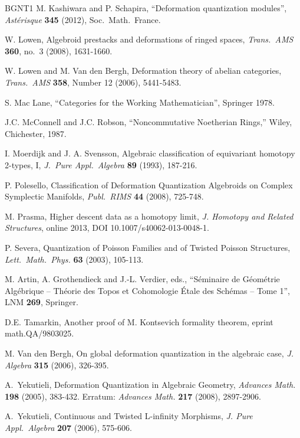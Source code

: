 \documentclass[a4paper, 10pt]{amsart}
\theoremstyle{definition}
\numberwithin{equation}{section}
\begin{document}
\begin{thebibliography}{BGNT1}
 M. Kashiwara and P. Schapira,
   ``Deformation quantization modules'',
    {\em Ast\'erisque} {\bf 345}  (2012), Soc.\ Math.\ France.

 W. Lowen,
    Algebroid prestacks and deformations of ringed spaces,
    {\em Trans.\ AMS} {\bf 360}, no.\ 3 (2008), 1631-1660.

 W. Lowen and M. Van den Bergh,
	Deformation theory of abelian categories,
	{\em Trans.\ AMS} {\bf 358}, Number 12 (2006), 5441-5483.

 S. Mac Lane,
	``Categories for the Working Mathematician'',
	Springer 1978.

 J.C. McConnell and J.C. Robson, ``Noncommutative
        Noetherian Rings,'' Wiley, Chichester, 1987.

 I. Moerdijk and J. A. Svensson,
  Algebraic classification of equivariant homotopy 2-types, I,
  {\em J.\ Pure Appl.\ Algebra} {\bf 89} (1993), 187-216.

 P. Polesello,
Classification of Deformation Quantization
Algebroids on Complex Symplectic Manifolds,
{\em Publ.\ RIMS} {\bf 44} (2008), 725-748.

 M. Prasma, 
Higher descent data as a homotopy limit,
{\em J. Homotopy and Related Structures}, online 2013, DOI 
10.1007/s40062-013-0048-1. 

 P. Severa, 
Quantization of Poisson Families and of Twisted Poisson Structures,
{\em Lett.\ Math.\ Phys.} {\bf 63} (2003), 105-113.

 M. Artin, A. Grothendieck and J.-L. Verdier,
	eds., ``S\'eminaire de G\'eom\'etrie Alg\'ebrique -- 
	Th\'eorie des Topos et Cohomologie \'Etale des
	Sch\'emas -- Tome 1'', 
	LNM {\bf 269}, Springer.

 D.E. Tamarkin, 
    Another proof of M. Kontsevich formality theorem, 
    eprint math.QA/9803025.

 M. Van den Bergh,
    On global deformation quantization in the algebraic case,
	{\em J. Algebra} {\bf 315} (2006), 326-395.

 A.\ Yekutieli,
    Deformation Quantization in Algebraic Geometry,
    {\em Advances Math.} {\bf 198} (2005), 383-432.
    Erratum: {\em Advances Math.}  {\bf 217} (2008), 2897-2906.

 A.\ Yekutieli,  
    Continuous and Twisted L-infinity Morphisms,
    {\em J. Pure Appl.\ Algebra} {\bf 207} (2006), 575-606.


\end{thebibliography}
\end{document}
